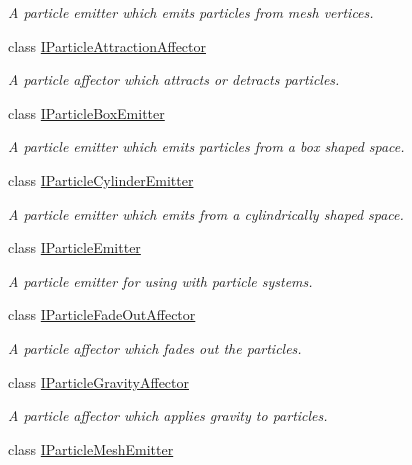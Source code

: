 \begin{DoxyCompactItemize}
\begin{DoxyCompactList}\small\item\em A particle emitter which emits particles from mesh vertices. \end{DoxyCompactList}\item 
class \hyperlink{classirr_1_1scene_1_1IParticleAttractionAffector}{I\+Particle\+Attraction\+Affector}
\begin{DoxyCompactList}\small\item\em A particle affector which attracts or detracts particles. \end{DoxyCompactList}\item 
class \hyperlink{classirr_1_1scene_1_1IParticleBoxEmitter}{I\+Particle\+Box\+Emitter}
\begin{DoxyCompactList}\small\item\em A particle emitter which emits particles from a box shaped space. \end{DoxyCompactList}\item 
class \hyperlink{classirr_1_1scene_1_1IParticleCylinderEmitter}{I\+Particle\+Cylinder\+Emitter}
\begin{DoxyCompactList}\small\item\em A particle emitter which emits from a cylindrically shaped space. \end{DoxyCompactList}\item 
class \hyperlink{classirr_1_1scene_1_1IParticleEmitter}{I\+Particle\+Emitter}
\begin{DoxyCompactList}\small\item\em A particle emitter for using with particle systems. \end{DoxyCompactList}\item 
class \hyperlink{classirr_1_1scene_1_1IParticleFadeOutAffector}{I\+Particle\+Fade\+Out\+Affector}
\begin{DoxyCompactList}\small\item\em A particle affector which fades out the particles. \end{DoxyCompactList}\item 
class \hyperlink{classirr_1_1scene_1_1IParticleGravityAffector}{I\+Particle\+Gravity\+Affector}
\begin{DoxyCompactList}\small\item\em A particle affector which applies gravity to particles. \end{DoxyCompactList}\item 
class \hyperlink{classirr_1_1scene_1_1IParticleMeshEmitter}{I\+Particle\+Mesh\+Emitter}

\end{DoxyCompactItemize}
